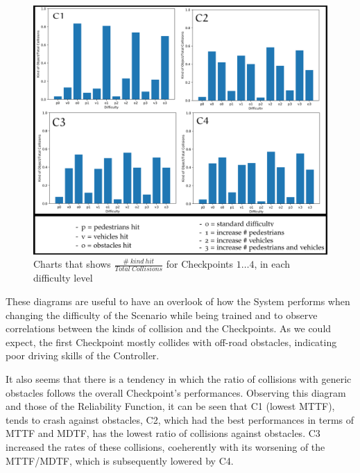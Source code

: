 \begin{figure}[h!]
	\includegraphics[width=\textwidth]{img/hit-ratios.png}
	\caption{Charts that shows $\frac{\# \: kind\: hit}{Total\: Collisions}$ for Checkpoints $1\dots 4$, in each difficulty level}
\end{figure}

These diagrams are useful to have an overlook of how the System performs when changing the difficulty of the Scenario while being trained and to observe correlations between the kinds of collision and the Checkpoints.
As we could expect, the first Checkpoint mostly collides with off-road obstacles, indicating poor driving skills of the Controller.

It also seems that there is a tendency in which the ratio of collisions with generic obstacles follows the overall Checkpoint's performances.
Observing this diagram and those of the Reliability Function, it can be seen that C1 (lowest MTTF), tends to crash against obstacles, C2, which had the best performances in terms of MTTF and MDTF, has the lowest ratio of collisions against obstacles. C3 increased the rates of these collisions, coeherently with its worsening of the MTTF/MDTF, which is subsequently lowered by C4.\newline

